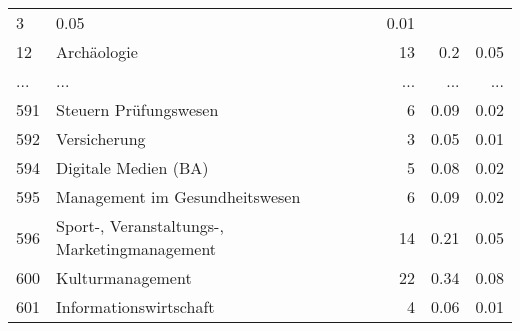 \begin{longtable}{lXrrr}
          \num{3} &
          \num[round-mode=places,round-precision=2]{0,05} &
          \num[round-mode=places,round-precision=2]{0,01} \\
        12 & \multicolumn{1}{X}{Archäologie} & %
          \num{13} &
          \num[round-mode=places,round-precision=2]{0,2} &
          \num[round-mode=places,round-precision=2]{0,05} \\
       ... & ... & ... & ... & ... \\
        591 & \multicolumn{1}{X}{Steuern Prüfungswesen} & %
          \num{6} &
          \num[round-mode=places,round-precision=2]{0,09} &
          \num[round-mode=places,round-precision=2]{0,02} \\

        592 & \multicolumn{1}{X}{Versicherung} & %
          \num{3} &
          \num[round-mode=places,round-precision=2]{0,05} &
          \num[round-mode=places,round-precision=2]{0,01} \\

        594 & \multicolumn{1}{X}{Digitale Medien (BA)} & %
          \num{5} &
          \num[round-mode=places,round-precision=2]{0,08} &
          \num[round-mode=places,round-precision=2]{0,02} \\

        595 & \multicolumn{1}{X}{Management im Gesundheitswesen} & %
          \num{6} &
          \num[round-mode=places,round-precision=2]{0,09} &
          \num[round-mode=places,round-precision=2]{0,02} \\

        596 & \multicolumn{1}{X}{Sport-, Veranstaltungs-, Marketingmanagement} & %
          \num{14} &
          \num[round-mode=places,round-precision=2]{0,21} &
          \num[round-mode=places,round-precision=2]{0,05} \\

        600 & \multicolumn{1}{X}{Kulturmanagement} & %
          \num{22} &
          \num[round-mode=places,round-precision=2]{0,34} &
          \num[round-mode=places,round-precision=2]{0,08} \\

        601 & \multicolumn{1}{X}{Informationswirtschaft} & %
          \num{4} &
          \num[round-mode=places,round-precision=2]{0,06} &
          \num[round-mode=places,round-precision=2]{0,01} \\


\end{longtable}
